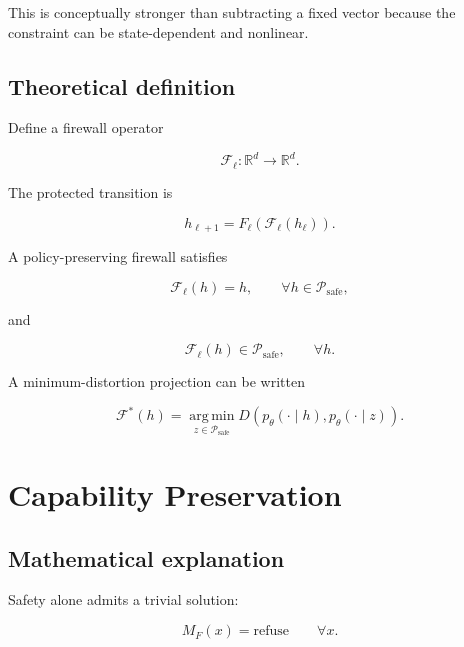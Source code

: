 \documentclass[11pt]{article}
\newcommand{\R}{\mathbb{R}}
\newcommand{\Psafe}{\mathcal{P}_{\mathrm{safe}}}
\newcommand{\argmin}{\operatorname*{arg\,min}}
\begin{document}
This is conceptually stronger than subtracting a fixed vector because the
constraint can be state-dependent and nonlinear.

\subsection*{Theoretical definition}

Define a firewall operator

\begin{equation}
\mathcal F_\ell:\R^d\rightarrow\R^d.
\end{equation}

The protected transition is

\begin{equation}
h_{\ell+1}
=
F_\ell\!\left(\mathcal F_\ell(h_\ell)\right).
\end{equation}

A policy-preserving firewall satisfies

\begin{equation}
\mathcal F_\ell(h)=h,
\qquad
\forall h\in\Psafe,
\end{equation}

and

\begin{equation}
\mathcal F_\ell(h)\in\Psafe,
\qquad
\forall h.
\end{equation}

A minimum-distortion projection can be written

\begin{equation}
\mathcal F^*(h)
=
\argmin_{z\in\Psafe}
D\!\left(
p_\theta(\cdot\mid h),
p_\theta(\cdot\mid z)
\right).
\end{equation}

\section{Capability Preservation}

\subsection*{Mathematical explanation}

Safety alone admits a trivial solution:

\begin{equation}
M_F(x)=\text{refuse}
\qquad
\forall x.
\end{equation}
\end{document}
